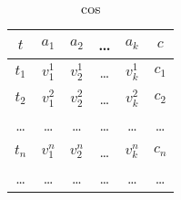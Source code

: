 \documentclass{standalone}
\begin{document}
\begin{table}[t]
\caption{cos}
\begin{tabular}{|c|c|c|c|c||c|}
\hline
 $t$&$a_{1}$&$a_{2}$&\dots &$a_{k}$&$c$\\ \hline \hline
 $t_{1}$&$v_{1}^{1}$&$v_{2}^{1}$&\dots &$v_{k}^{1}$&$c_{1}$ \\ \hline
 $t_{2}$&$v_{1}^{2}$&$v_{2}^{2}$&\dots &$v_{k}^{2}$&$c_{2}$ \\ \hline
 \dots & \dots &\dots &\dots &\dots &\dots\\ \hline
 $t_{n}$&$v_{1}^{n}$&$v_{2}^{n}$&\dots &$v_{k}^{n}$&$c_{n}$ \\ \hline
 \dots & \dots &\dots &\dots &\dots &\dots \\ \hline
\end{tabular}
\end{table}
\end{document}
